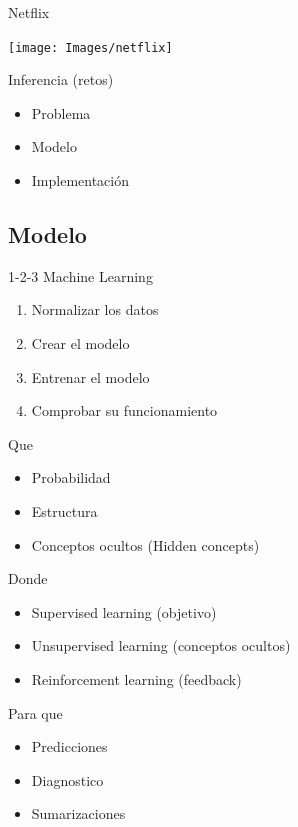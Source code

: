 \documentclass{beamer}
\begin{document}
\begin{frame}{Netflix}
    \begin{center}
        \texttt{[image: Images/netflix]}
    \end{center}
\end{frame}

\begin{frame}{Inferencia (retos)}
    \begin{itemize}
        \item Problema
        \item Modelo
        \item Implementación
    \end{itemize}
\end{frame}

\subsection{Modelo}
\begin{frame}{1-2-3 Machine Learning}
    \begin{enumerate}
        \item Normalizar los datos
        \item Crear el modelo
        \item Entrenar el modelo
        \item Comprobar su funcionamiento
    \end{enumerate}
\end{frame}

\begin{frame}{Que}
    \begin{itemize}
        \item Probabilidad
        \item Estructura
        \item Conceptos ocultos (Hidden concepts)
    \end{itemize}
\end{frame}

\begin{frame}{Donde}
    \begin{itemize}
        \item Supervised learning (objetivo)
        \item Unsupervised learning (conceptos ocultos)
        \item Reinforcement learning (feedback)
    \end{itemize}
\end{frame}

\begin{frame}{Para que}
    \begin{itemize}
        \item Predicciones
        \item Diagnostico
        \item Sumarizaciones
    \end{itemize}
\end{frame}
\end{document}

